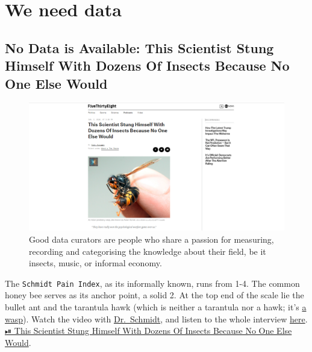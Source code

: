 \documentclass[
  letterpaper,
  DIV=11,
  numbers=noendperiod]{scrreprt}
\begin{document}
\section{We need data}\label{sec-inspiration-data-need}

\subsection{No Data is Available: This Scientist Stung Himself With
Dozens Of Insects Because No One Else
Would}\label{no-data-is-available-this-scientist-stung-himself-with-dozens-of-insects-because-no-one-else-would}

\begin{figure}[H]

{\centering \includegraphics{png/inspiration/schmidt_pain_index.png}

}

\caption{Good data curators are people who share a passion for
measuring, recording and categorising the knowledge about their field,
be it insects, music, or informal economy.}

\end{figure}%

The \texttt{Schmidt\ Pain\ Index}, as its informally known, runs from
1-4. The common honey bee serves as its anchor point, a solid 2. At the
top end of the scale lie the bullet ant and the tarantula hawk (which is
neither a tarantula nor a hawk; it's
\href{https://www.wired.com/2015/07/absurd-creature-of-the-week-tarantula-hawk/}{a
wasp}). Watch the video with
\href{https://youtu.be/i0LjT-qkUes}{Dr.~Schmidt}, and listen to the
whole interview
\href{https://podcasts.apple.com/us/podcast/48-the-schmidt-sting-pain-index/id1011406983?i=1000391467968}{here}.
\href{https://fivethirtyeight.com/features/this-scientist-stung-himself-with-dozens-of-insects-because-no-one-else-would/}{⏯
This Scientist Stung Himself With Dozens Of Insects Because No One Else
Would}.
\end{document}
